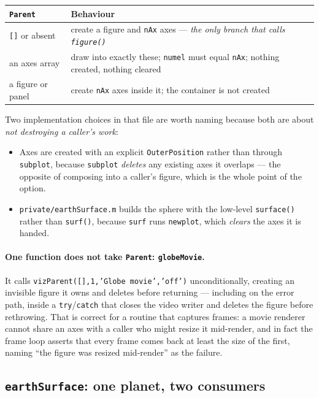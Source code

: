 \documentclass[11pt]{article}
\newcommand{\code}[1]{\texttt{#1}}
\begin{document}
\begin{center}
\begin{tabular}{ll}
\toprule
\code{Parent} & Behaviour \\
\midrule
\code{[]} or absent  & create a figure and \code{nAx} axes --- \emph{the only branch that calls \code{figure()}} \\
an axes array        & draw into exactly these; \code{numel} must equal \code{nAx}; nothing created, nothing cleared \\
a figure or panel    & create \code{nAx} axes inside it; the container is not created \\
\bottomrule
\end{tabular}
\end{center}

Two implementation choices in that file are worth naming because both are
about \emph{not destroying a caller's work}:

\begin{itemize}
\item Axes are created with an explicit \code{OuterPosition} rather than
through \code{subplot}, because \code{subplot} \emph{deletes} any existing axes
it overlaps --- the opposite of composing into a caller's figure, which is the
whole point of the option.
\item \code{private/earthSurface.m} builds the sphere with the low-level
\code{surface()} rather than \code{surf()}, because \code{surf} runs
\code{newplot}, which \emph{clears} the axes it is handed.
\end{itemize}

\paragraph{One function does not take \code{Parent}: \code{globeMovie}.} It
calls \code{vizParent([],1,'Globe movie','off')} unconditionally, creating an
invisible figure it owns and deletes before returning --- including on the
error path, inside a \code{try}/\code{catch} that closes the video writer and
deletes the figure before rethrowing. That is correct for a routine that
captures frames: a movie renderer cannot share an axes with a caller who might
resize it mid-render, and in fact the frame loop asserts that every frame comes
back at least the size of the first, naming ``the figure was resized
mid-render'' as the failure.

\subsection{\code{earthSurface}: one planet, two consumers}
\end{document}
